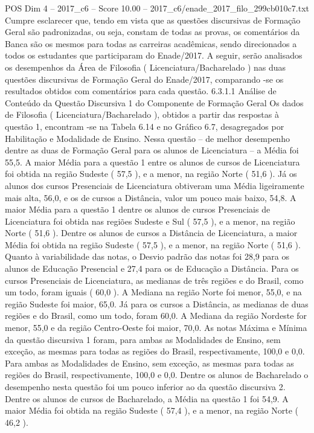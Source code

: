 \begin{textsample}{POS Dim 4 – 2017\_c6 – Score 10.00 – 2017\_c6/enade\_2017\_filo\_299cb010c7.txt}
Cumpre esclarecer que, tendo em vista que as questões discursivas de Formação Geral são padronizadas, ou seja, constam de todas as provas, os comentários da Banca são os mesmos para todas as carreiras acadêmicas, sendo direcionados a todos os estudantes que participaram do Enade/2017.
A seguir, serão analisados os desempenhos da Área de Filosofia ( Licenciatura/Bacharelado ) nas duas questões discursivas de Formação Geral do Enade/2017, comparando -se os resultados obtidos com comentários para cada questão. 6.3.1.1 Análise de Conteúdo da Questão Discursiva 1 do Componente de Formação Geral Os dados de Filosofia ( Licenciatura/Bacharelado ), obtidos a partir das respostas à questão 1, encontram -se na Tabela 6.14 e no Gráfico 6.7, desagregados por Habilitação e Modalidade de Ensino.
Nessa questão – de melhor desempenho dentre as duas de Formação Geral para os alunos de Licenciatura – a Média foi 55,5.
A maior Média para a questão 1 entre os alunos de cursos de Licenciatura foi obtida na região Sudeste ( 57,5 ), e a menor, na região Norte ( 51,6 ).
Já os alunos dos cursos Presenciais de Licenciatura obtiveram uma Média ligeiramente mais alta, 56,0, e os de cursos a Distância, valor um pouco mais baixo, 54,8.
A maior Média para a questão 1 dentre os alunos de cursos Presenciais de Licenciatura foi obtida nas regiões Sudeste e Sul ( 57,5 ), e a menor, na região Norte ( 51,6 ).
Dentre os alunos de cursos a Distância de Licenciatura, a maior Média foi obtida na região Sudeste ( 57,5 ), e a menor, na região Norte ( 51,6 ).
Quanto à variabilidade das notas, o Desvio padrão das notas foi 28,9 para os alunos de Educação Presencial e 27,4 para os de Educação a Distância.
Para os cursos Presenciais de Licenciatura, as medianas de três regiões e do Brasil, como um todo, foram iguais ( 60,0 ).
A Mediana na região Norte foi menor, 55,0, e na região Sudeste foi maior, 65,0.
Já para os cursos a Distância, as medianas de duas regiões e do Brasil, como um todo, foram 60,0.
A Mediana da região Nordeste for menor, 55,0 e da região Centro-Oeste foi maior, 70,0.
As notas Máxima e Mínima da questão discursiva 1 foram, para ambas as Modalidades de Ensino, sem exceção, as mesmas para todas as regiões do Brasil, respectivamente, 100,0 e 0,0.
Para ambas as Modalidades de Ensino, sem exceção, as mesmas para todas as regiões do Brasil, respectivamente, 100,0 e 0,0.
Dentre os alunos de Bacharelado o desempenho nesta questão foi um pouco inferior ao da questão discursiva 2.
Dentre os alunos de cursos de Bacharelado, a Média na questão 1 foi 54,9.
A maior Média foi obtida na região Sudeste ( 57,4 ), e a menor, na região Norte ( 46,2 ).

\end{textsample}
